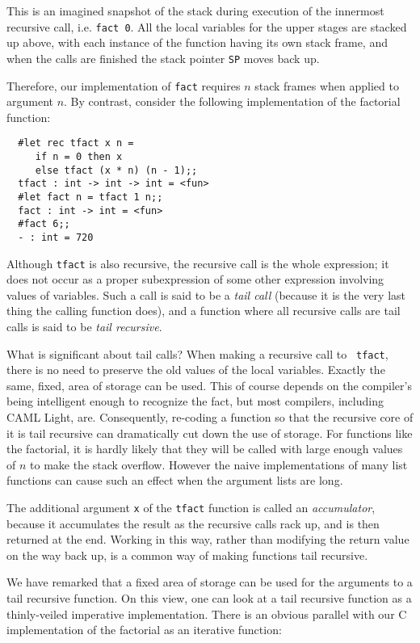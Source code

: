 This is an imagined snapshot of the stack during execution of the innermost
recursive call, i.e. {\tt fact 0}. All the local variables for the upper stages
are stacked up above, with each instance of the function having its own stack
frame, and when the calls are finished the stack pointer {\tt SP} moves back
up.

Therefore, our implementation of {\tt fact} requires $n$ stack frames when
applied to argument $n$. By contrast, consider the following implementation of
the factorial function:

\begin{boxed}\begin{verbatim}
  #let rec tfact x n =
     if n = 0 then x
     else tfact (x * n) (n - 1);;
  tfact : int -> int -> int = <fun>
  #let fact n = tfact 1 n;;
  fact : int -> int = <fun>
  #fact 6;;
  - : int = 720
\end{verbatim}\end{boxed}

Although {\tt tfact} is also recursive, the recursive call is the whole
expression; it does not occur as a proper subexpression of some other
expression involving values of variables. Such a call is said to be a {\em tail
call} (because it is the very last thing the calling function does), and a
function where all recursive calls are tail calls is said to be {\em tail
recursive}.

What is significant about tail calls? When making a recursive call to {\tt
tfact}, there is no need to preserve the old values of the local variables.
Exactly the same, fixed, area of storage can be used. This of course depends on
the compiler's being intelligent enough to recognize the fact, but most
compilers, including CAML Light, are. Consequently, re-coding a function so
that the recursive core of it is tail recursive can dramatically cut down the
use of storage. For functions like the factorial, it is hardly likely that they
will be called with large enough values of $n$ to make the stack overflow.
However the naive implementations of many list functions can cause such an
effect when the argument lists are long.

The additional argument {\tt x} of the {\tt tfact} function is called an {\em
accumulator}, because it accumulates the result as the recursive calls rack up,
and is then returned at the end. Working in this way, rather than modifying the
return value on the way back up, is a common way of making functions tail
recursive.

We have remarked that a fixed area of storage can be used for the
arguments to a tail recursive function. On this view, one can look at a tail
recursive function as a thinly-veiled imperative implementation. There is an
obvious parallel with our C implementation of the factorial as an iterative
function:

